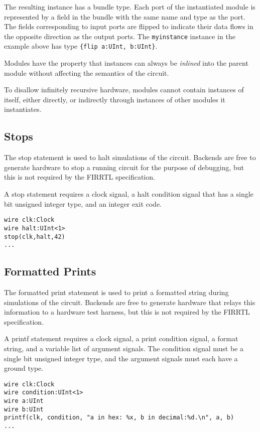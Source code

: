 \documentclass[12pt]{article}
\begin{document}
The resulting instance has a bundle type. Each port of the instantiated module is represented by a field in the bundle with the same name and type as the port. The fields corresponding to input ports are flipped to indicate their data flows in the opposite direction as the output ports. The \verb|myinstance| instance in the example above has type \verb|{flip a:UInt, b:UInt}|.

Modules have the property that instances can always be {\em inlined} into the parent module without affecting the semantics of the circuit.

To disallow infinitely recursive hardware, modules cannot contain instances of itself, either directly, or indirectly through instances of other modules it instantiates.

\subsection{Stops}
The stop statement is used to halt simulations of the circuit. Backends are free to generate hardware to stop a running circuit for the purpose of debugging, but this is not required by the FIRRTL specification.

A stop statement requires a clock signal, a halt condition signal that has a single bit unsigned integer type, and an integer exit code.

\begin{lstlisting}
wire clk:Clock
wire halt:UInt<1>
stop(clk,halt,42)
...
\end{lstlisting}

\subsection{Formatted Prints}
The formatted print statement is used to print a formatted string during simulations of the circuit. Backends are free to generate hardware that relays this information to a hardware test harness, but this is not required by the FIRRTL specification.

A printf statement requires a clock signal, a print condition signal, a format string, and a variable list of argument signals. The condition signal must be a single bit unsigned integer type, and the argument signals must each have a ground type.

\begin{lstlisting}
wire clk:Clock
wire condition:UInt<1>
wire a:UInt
wire b:UInt
printf(clk, condition, "a in hex: %x, b in decimal:%d.\n", a, b)
...
\end{lstlisting}
\end{document}
